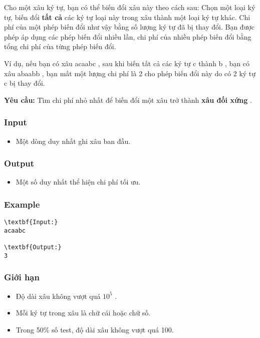 

Cho một xâu ký tự, bạn có thể biến đổi xâu này theo cách sau: Chọn một loại ký tự, biến đổi \textbf{ tất cả } các ký tự loại này trong xâu thành một loại ký tự khác. Chi phí của một phép biến đổi như vậy bằng số lượng ký tự đã bị thay đổi. Bạn được phép áp dụng các phép biến đổi nhiều lần, chi phí của nhiều phép biến đổi bằng tổng chi phí của từng phép biến đổi.

Ví dụ, nếu bạn có xâu acaabc , sau khi biến tất cả các ký tự c thành b , bạn có xâu abaabb , bạn mất một lượng chi phí là 2 cho phép biến đổi này do có 2 ký tự c bị thay đổi.

\textbf{Yêu cầu: } Tìm chi phí nhỏ nhất để biến đổi một xâu trở thành \textbf{ xâu đối xứng } .

\subsubsection{Input}
\begin{itemize}
	\item Một dòng duy nhất ghi xâu ban đầu.
\end{itemize}

\subsubsection{Output}
\begin{itemize}
	\item Một số duy nhất thể hiện chi phí tối ưu.
\end{itemize}

\subsubsection{Example}
\begin{verbatim}
\textbf{Input:}
acaabc

\textbf{Output:}
3\end{verbatim}

\subsubsection{Giới hạn}
\begin{itemize}
	\item Độ dài xâu không vượt quá $10^{5}$ .
	\item Mỗi ký tự trong xâu là chữ cái hoặc chữ số.
	\item Trong 50\% số test, độ dài xâu không vượt quá 100.
\end{itemize}
